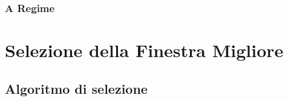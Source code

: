 
            \subsubsection{A Regime} %
            \label{ssub:a_regime}
            


    \section{Selezione della Finestra Migliore} %
    \label{sec:best_detection_window}
        \subsection{Algoritmo di selezione}
    \label{sec:gc_algorithm_comparison}